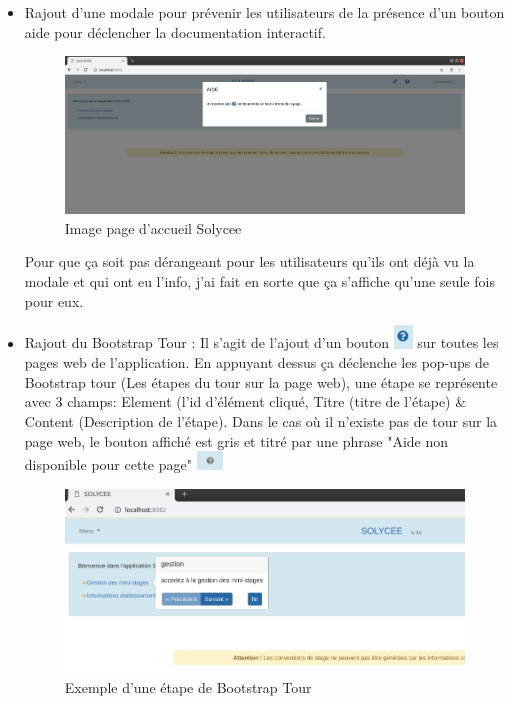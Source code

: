 \documentclass[12pt]{article}
\begin{document}
\begin{itemize}
\item Rajout d'une modale pour prévenir les utilisateurs de la présence d'un bouton aide pour déclencher la documentation interactif.

\begin{figure}[H]
	\centering
 		\includegraphics[width=1\textwidth]{diagrammes/aide_modal.png}
  		\caption{Image page d'accueil Solycee}
	\end{figure}
	
Pour que ça soit pas dérangeant pour les utilisateurs qu'ils ont déjà vu la modale et qui ont eu l'info, j'ai fait en sorte que ça s'affiche qu'une seule fois pour eux. 
   
\item Rajout du Bootstrap Tour : Il s'agit de l'ajout d'un bouton \includegraphics[width=5mm,scale=0.5]{diagrammes/Bouton_aideDispo.png} sur toutes les pages web de l'application. En appuyant dessus ça déclenche les pop-ups  de Bootstrap tour (Les étapes du tour sur la page web), une étape se représente avec 3 champs: Element (l'id d'élément cliqué, Titre (titre de l'étape) \& Content (Description de l'étape). Dans le cas où il n'existe pas de tour sur la page web, le bouton affiché est gris et titré par une phrase "Aide non disponible pour cette page" \includegraphics[width=7mm,scale=0.5]{diagrammes/Bouton_aideNonDispo.png}  

\begin{figure}[H]
	\centering
 		\includegraphics[width=1\textwidth]{diagrammes/exemple_Tour.png} 
  		\caption{Exemple d'une étape de Bootstrap Tour}
	\end{figure}


\end{itemize}
\end{document}
